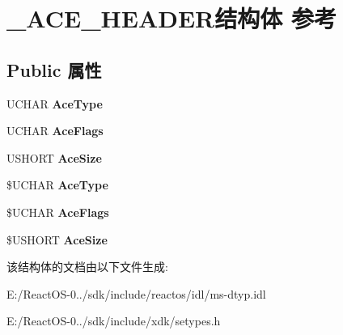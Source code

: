 \hypertarget{struct___a_c_e___h_e_a_d_e_r}{}\section{\+\_\+\+A\+C\+E\+\_\+\+H\+E\+A\+D\+E\+R结构体 参考}
\label{struct___a_c_e___h_e_a_d_e_r}
\subsection*{Public 属性}
\begin{DoxyCompactItemize}
\item 
\mbox{\label{struct___a_c_e___h_e_a_d_e_r_acfe3343d4b304d024e5560b9c385fcbf}} 
U\+C\+H\+AR {\bfseries Ace\+Type}
\item 
\mbox{\label{struct___a_c_e___h_e_a_d_e_r_aa1999bc78c39c6379f555344863bf214}} 
U\+C\+H\+AR {\bfseries Ace\+Flags}
\item 
\mbox{\label{struct___a_c_e___h_e_a_d_e_r_a842f42715e3dc03478cc15e7b3f6fb51}} 
U\+S\+H\+O\+RT {\bfseries Ace\+Size}
\item 
\mbox{\label{struct___a_c_e___h_e_a_d_e_r_ab406c0dcd1cec327d1dec64cac5c980c}} 
\$U\+C\+H\+AR {\bfseries Ace\+Type}
\item 
\mbox{\label{struct___a_c_e___h_e_a_d_e_r_ae07c13aa9bf5a8b5259ed68f3b86820c}} 
\$U\+C\+H\+AR {\bfseries Ace\+Flags}
\item 
\mbox{\label{struct___a_c_e___h_e_a_d_e_r_abb98831863520d91f400e3a81d9e8ede}} 
\$U\+S\+H\+O\+RT {\bfseries Ace\+Size}
\end{DoxyCompactItemize}


该结构体的文档由以下文件生成\+:\begin{DoxyCompactItemize}
\item 
E\+:/\+React\+O\+S-\/0../sdk/include/reactos/idl/ms-\/dtyp.\+idl\item 
E\+:/\+React\+O\+S-\/0../sdk/include/xdk/setypes.\+h\end{DoxyCompactItemize}
